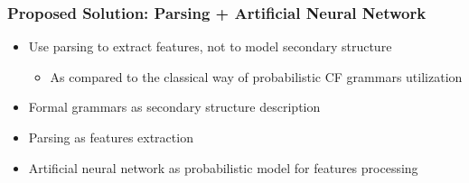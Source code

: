 \documentclass[xcolor=table]{beamer}
\begin{document}
\begin{frame} \frametitle{Proposed Solution: Parsing + Artificial Neural Network}

\begin{itemize}
  \item Use parsing to extract features, not to model secondary structure
  \begin{itemize}
    \item As compared to the classical way of probabilistic CF grammars utilization
  \end{itemize}
  \pause
  \item Formal grammars as secondary structure description
  \item Parsing as features extraction
  \item Artificial neural network as probabilistic model for features processing
\end{itemize}

\end{frame}
\end{document}

